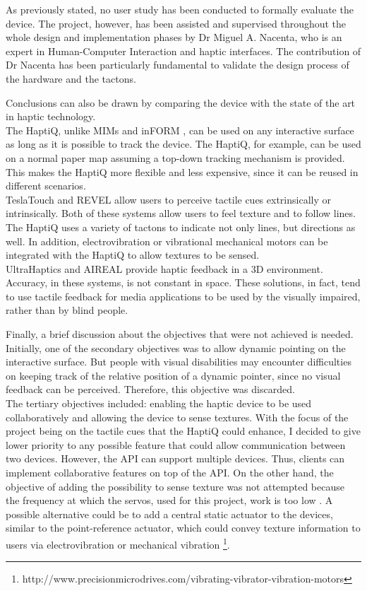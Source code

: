 As previously stated, no user study has been conducted to formally evaluate the device.
The project, however, has been assisted and supervised throughout the whole design and implementation phases by Dr Miguel A. Nacenta, who is an expert in Human-Computer Interaction and haptic interfaces. The contribution of Dr Nacenta has been particularly fundamental to validate the design process of the hardware and the tactons.

Conclusions can also be drawn by comparing the device with the state of the art in haptic technology. \\
The HaptiQ, unlike MIMs \cite{brock2010usage} and inFORM \cite{follmer2013inform}, can be used on any interactive surface as long as it is possible to track the device. The HaptiQ, for example, can be used on a normal paper map assuming a top-down tracking mechanism is provided. This makes the HaptiQ more flexible and less expensive, since it can be reused in different scenarios.\\
TeslaTouch \cite{bau2010teslatouch} and REVEL \cite{bau2012revel} allow users to perceive tactile cues extrinsically or intrinsically. Both of these systems allow users to feel texture and to follow lines. The HaptiQ uses a variety of tactons to indicate not only lines, but directions as well. In addition, electrovibration or vibrational mechanical motors can be integrated with the HaptiQ to allow textures to be sensed. \\
UltraHaptics \cite{carter2013ultrahaptics} and AIREAL \cite{sodhi2013aireal} provide haptic feedback in a 3D environment. Accuracy, in these systems, is not constant in space. These solutions, in fact, tend to use tactile feedback for media applications to be used by the visually impaired, rather than by blind people. 

Finally, a brief discussion about the objectives that were not achieved is needed. \\
Initially, one of the secondary objectives was to allow dynamic pointing on the interactive surface. But people with visual disabilities may encounter difficulties on keeping track of the relative position of a dynamic pointer, since no visual feedback can be perceived. Therefore, this objective was discarded. \\
The tertiary objectives included: enabling the haptic device to be used collaboratively and allowing the device to sense textures. 
With the focus of the project being on the tactile cues that the HaptiQ could enhance, I decided to give lower priority to any possible feature that could allow communication between two devices. However, the API can support multiple devices. Thus, clients can implement  collaborative features on top of the API.
On the other hand, the objective of adding the possibility to sense texture was not attempted because the frequency at which the servos, used for this project, work is too low \cite{brown2005first}. A possible alternative could be to add a central static actuator to the devices, similar to the point-reference actuator, which could convey texture information to users via electrovibration \cite{bau2010teslatouch, bau2012revel} or mechanical vibration \footnote{http://www.precisionmicrodrives.com/vibrating-vibrator-vibration-motors}.   